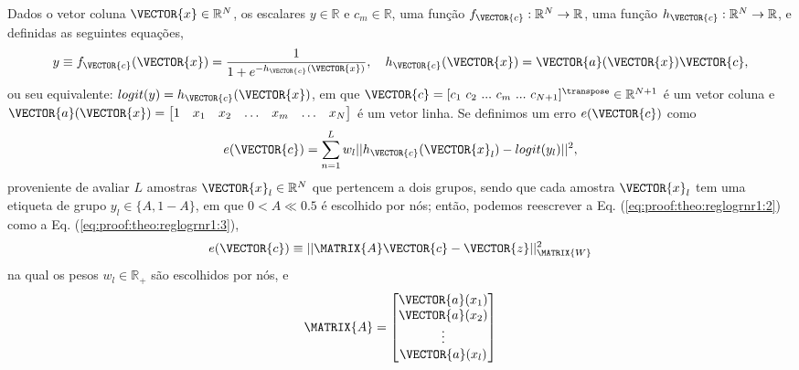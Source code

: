 
\begin{myproofT}\label{proof:theo:reglogrnr1}
Dados
o vetor coluna $\VECTOR{x} \in \mathbb{R}^{N}$, os escalares $y \in \mathbb{R}$ e $c_m \in \mathbb{R}$,
uma função $f_{\VECTOR{c}}:\mathbb{R}^{N} \rightarrow \mathbb{R}$, 
uma função $h_{\VECTOR{c}}:\mathbb{R}^{N} \rightarrow \mathbb{R}$,  e 
definidas as seguintes equações,
\begin{equation}\label{eq:proof:theo:reglogrnr1:1}
y\equiv f_{\VECTOR{c}}(\VECTOR{x})= \frac{1}{1+e^{-h_{\VECTOR{c}}(\VECTOR{x}) }},
\quad h_{\VECTOR{c}}(\VECTOR{x}) =  \VECTOR{a}(\VECTOR{x})\VECTOR{c},
\end{equation}
ou seu equivalente: $logit(y)=h_{\VECTOR{c}}(\VECTOR{x})$,
em que $\VECTOR{c}=[c_1~ c_2~ ...~ c_m~ ...~ c_{N+1}]^{\transpose} \in \mathbb{R}^{N+1}$ é um vetor coluna e
$\VECTOR{a}(\VECTOR{x})=\begin{bmatrix} 
1& x_1& x_2& \hdots & x_m& \hdots& x_N
\end{bmatrix}$ é um vetor linha.
Se definimos um erro $e(\VECTOR{c})$ como
\begin{equation}\label{eq:proof:theo:reglogrnr1:2}
e(\VECTOR{c}) =  \sum_{n=1}^{L} w_l||h_{\VECTOR{c}}(\VECTOR{x}_l)-logit(y_l)||^2,
\end{equation}
proveniente de avaliar $L$ amostras $\VECTOR{x}_l \in \mathbb{R}^{N}$ que pertencem a dois grupos, 
sendo que cada amostra $\VECTOR{x}_l$ tem uma etiqueta de grupo $y_l\in \{A,1-A\}$, 
em que $0<A\ll 0.5$ é escolhido por nós;
então, podemos reescrever a Eq. (\ref{eq:proof:theo:reglogrnr1:2}) como a Eq. (\ref{eq:proof:theo:reglogrnr1:3}),
\begin{equation}\label{eq:proof:theo:reglogrnr1:3}
e(\VECTOR{c}) \equiv ||\MATRIX{A}\VECTOR{c}-\VECTOR{z}||_{\MATRIX{W}}^2 
\end{equation}
na qual os pesos $w_l \in \mathbb{R}_+$ são escolhidos por nós, e 
\begin{equation}\label{eq:proof:reglogrnr1:4}
\MATRIX{A}=\begin{bmatrix}
\VECTOR{a}(x_1)\\
\VECTOR{a}(x_2)\\
\vdots\\
\VECTOR{a}(x_l)\\

\end{bmatrix}
\end{equation}
\end{myproofT}
